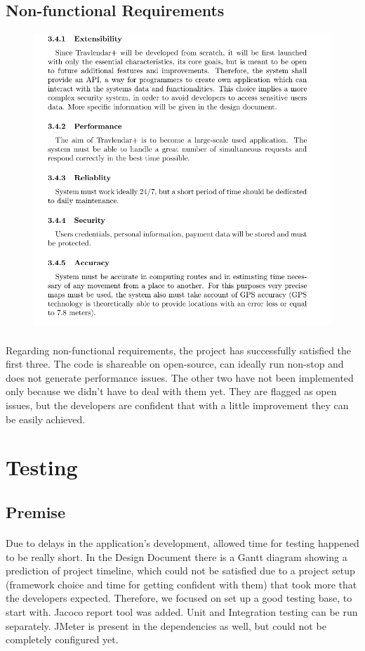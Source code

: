 \documentclass{article}
\begin{document}
		\subsection{Non-functional Requirements}
			\begin{figure}[H]
			\includegraphics[width=\linewidth]{Images/Goals/Non-functional_requirements.png}
			\label{fig:G8}
			\end{figure}
		\paragraph{}Regarding non-functional requirements, the project has successfully satisfied the first three. The code is shareable on open-source, can ideally run non-stop and does not generate performance issues. The other two have not been implemented only because we didn't have to deal with them yet. They are flagged as open issues, but the developers are confident that with a little improvement they can be easily achieved.
\newpage
	\section{Testing}
		\subsection{Premise}
		\paragraph{}Due to delays in the application’s development, allowed time for testing happened to be really short. In the Design Document there is a Gantt diagram showing a prediction of project timeline, which could not be satisfied due to a project setup (framework choice and time for getting confident with them) that took more that the developers expected. Therefore, we focused on set up a good testing base, to start with. Jacoco report tool was added. Unit and Integration testing can be run separately. JMeter is present in the dependencies as well, but could not be completely configured yet. 
\end{document}
